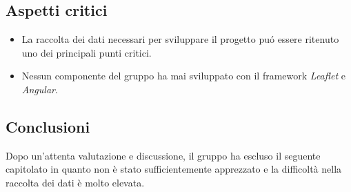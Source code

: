 \subsection{Aspetti critici}
\begin{itemize}
	\item La raccolta dei dati necessari per sviluppare il progetto pu\'o essere ritenuto uno dei principali punti critici.
	\item Nessun componente del gruppo ha mai sviluppato con il framework \textit{Leaflet} e \textit{Angular}.
\end{itemize}

\subsection{Conclusioni}
Dopo un'attenta valutazione e discussione, il gruppo ha escluso il seguente capitolato in quanto non è stato sufficientemente apprezzato e la difficoltà nella raccolta dei dati è molto elevata.
